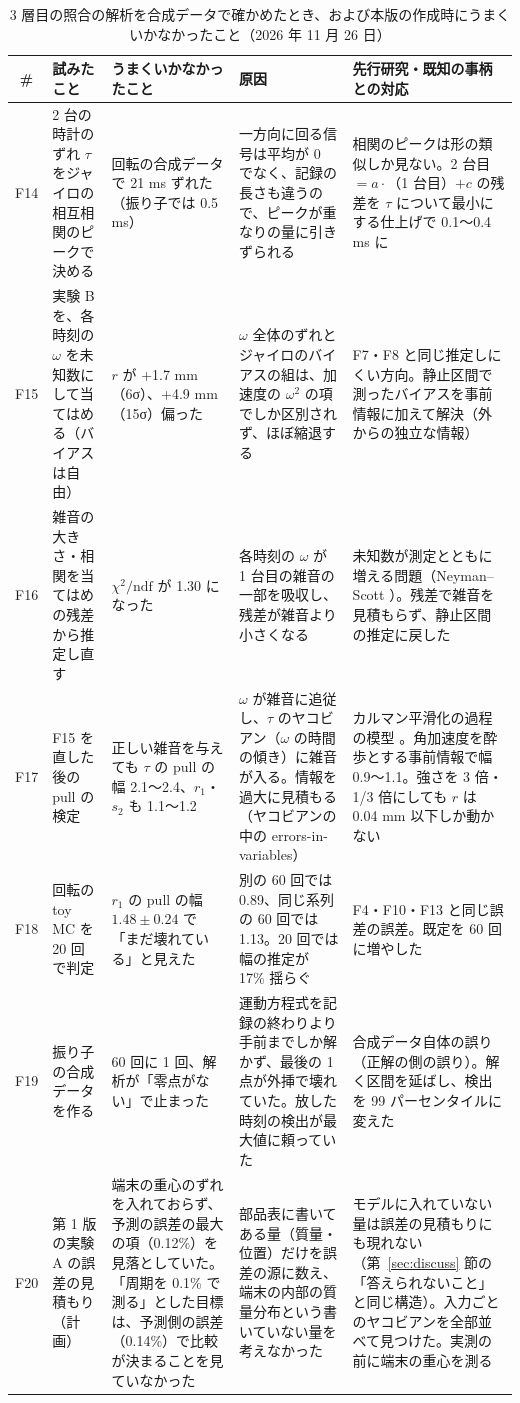 \documentclass[paper=a4paper,fontsize=10pt,twocolumn,column_gap=2zw,line_length=24zw,number_of_lines=46,head_space=20mm]{jlreq}
\begin{document}
\begin{table}[t]\centering\footnotesize
\caption{3 層目の照合の解析を合成データで確かめたとき、および本版の作成時にうまくいかなかったこと（2026 年 11 月 26 日）}\label{tab:fail2}
\setlength{\tabcolsep}{3pt}
\begin{tabular}{cp{}p{}p{}p{}}\toprule
\# & 試みたこと & うまくいかなかったこと & 原因 & 先行研究・既知の事柄との対応 \\\midrule
F14 & 2 台の時計のずれ $\tau$ をジャイロの相互相関のピークで決める & 回転の合成データで 21 ms ずれた（振り子では 0.5 ms） & 一方向に回る信号は平均が 0 でなく、記録の長さも違うので、ピークが重なりの量に引きずられる & 相関のピークは形の類似しか見ない。2 台目 $= a\cdot$（1 台目）$+c$ の残差を $\tau$ について最小にする仕上げで 0.1〜0.4 ms に \\
F15 & 実験 B を、各時刻の $\omega$ を未知数にして当てはめる（バイアスは自由） & $r$ が +1.7 mm（6σ）、+4.9 mm（15σ）偏った & $\omega$ 全体のずれとジャイロのバイアスの組は、加速度の $\omega^2$ の項でしか区別されず、ほぼ縮退する & F7・F8 と同じ推定しにくい方向。静止区間で測ったバイアスを事前情報に加えて解決（外からの独立な情報） \\
F16 & 雑音の大きさ・相関を当てはめの残差から推定し直す & $\chi^2/\mathrm{ndf}$ が 1.30 になった & 各時刻の $\omega$ が 1 台目の雑音の一部を吸収し、残差が雑音より小さくなる & 未知数が測定とともに増える問題（Neyman--Scott \cite{neyman1948}）。残差で雑音を見積もらず、静止区間の推定に戻した \\
F17 & F15 を直した後の pull の検定 & 正しい雑音を与えても $\tau$ の pull の幅 2.1〜2.4、$r_1$・$s_2$ も 1.1〜1.2 & $\omega$ が雑音に追従し、$\tau$ のヤコビアン（$\omega$ の時間の傾き）に雑音が入る。情報を過大に見積もる（ヤコビアンの中の errors-in-variables） & カルマン平滑化の過程の模型 \cite{fruhwirth1987}。角加速度を酔歩とする事前情報で幅 0.9〜1.1。強さを 3 倍・1/3 倍にしても $r$ は 0.04 mm 以下しか動かない \\
F18 & 回転の toy MC を 20 回で判定 & $r_1$ の pull の幅 $1.48\pm0.24$ で「まだ壊れている」と見えた & 別の 60 回では 0.89、同じ系列の 60 回では 1.13。20 回では幅の推定が 17\% 揺らぐ & F4・F10・F13 と同じ誤差の誤差。既定を 60 回に増やした \\
F19 & 振り子の合成データを作る & 60 回に 1 回、解析が「零点がない」で止まった & 運動方程式を記録の終わりより手前までしか解かず、最後の 1 点が外挿で壊れていた。放した時刻の検出が最大値に頼っていた & 合成データ自体の誤り（正解の側の誤り）。解く区間を延ばし、検出を 99 パーセンタイルに変えた \\
F20 & 第 1 版の実験 A の誤差の見積もり（計画） & 端末の重心のずれを入れておらず、予測の誤差の最大の項（0.12\%）を見落としていた。「周期を 0.1\% で測る」とした目標は、予測側の誤差（0.14\%）で比較が決まることを見ていなかった & 部品表に書いてある量（質量・位置）だけを誤差の源に数え、端末の内部の質量分布という書いていない量を考えなかった & モデルに入れていない量は誤差の見積もりにも現れない（第~\ref{sec:discuss} 節の「答えられないこと」と同じ構造）。入力ごとのヤコビアンを全部並べて見つけた。実測の前に端末の重心を測る \\\bottomrule
\end{tabular}
\end{table}
\end{document}
